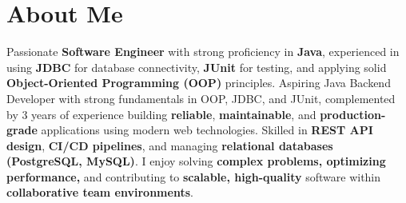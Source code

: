 \section{About Me}
    \begin{onecolentry}
        Passionate \textbf{Software Engineer} with strong proficiency in \textbf{Java}, experienced in using \textbf{JDBC} for database connectivity, \textbf{JUnit} for testing, and applying solid \textbf{Object-Oriented Programming (OOP)} principles. Aspiring Java Backend Developer with strong fundamentals in OOP, JDBC, and JUnit, complemented by 3 years of experience building \textbf{reliable}, \textbf{maintainable}, and \textbf{production-grade} applications using modern web technologies. Skilled in \textbf{REST API design}, \textbf{CI/CD pipelines}, and managing \textbf{relational databases (PostgreSQL, MySQL)}. I enjoy solving \textbf{complex problems, optimizing performance,} and contributing to \textbf{scalable, high-quality} software within \textbf{collaborative team environments}.
    \end{onecolentry}
